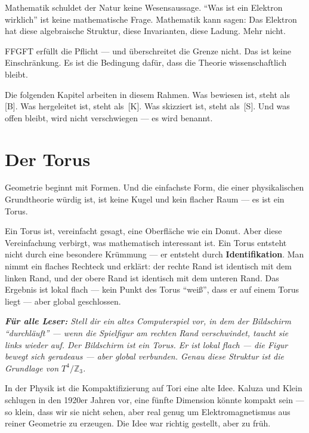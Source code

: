 \documentclass[11pt,oneside]{book}
\newcommand{\status}[1]{\penalty10000\,{\scriptsize\textcolor{gray!60}{[#1]}}}
\newenvironment{laierspur}{%
  \par\vspace{4pt}%
  \noindent\small\itshape\color{blue!60!black}%
  \textbf{Für alle Leser:}\enspace\ignorespaces}{%
  \par\vspace{4pt}\normalsize\normalfont\normalcolor}
\begin{document}
Mathematik schuldet der Natur keine Wesensaussage. \enquote{Was ist ein Elektron
wirklich} ist keine mathematische Frage. Mathematik kann sagen: Das Elektron
hat diese algebraische Struktur, diese Invarianten, diese Ladung. Mehr nicht.


FFGFT erfüllt die Pflicht — und überschreitet die Grenze nicht. Das ist
keine Einschränkung. Es ist die Bedingung dafür, dass die Theorie
wissenschaftlich bleibt.


Die folgenden Kapitel arbeiten in diesem Rahmen. Was bewiesen ist, steht
als \status{B}. Was hergeleitet ist, steht als \status{K}. Was skizziert ist, steht
als \status{S}. Und was offen bleibt, wird nicht verschwiegen — es wird benannt.






\chapter{Der Torus}

Geometrie beginnt mit Formen. Und die einfachste Form, die einer physikalischen
Grundtheorie würdig ist, ist keine Kugel und kein flacher Raum — es ist
ein Torus.


Ein Torus ist, vereinfacht gesagt, eine Oberfläche wie ein Donut. Aber diese
Vereinfachung verbirgt, was mathematisch interessant ist. Ein Torus entsteht
nicht durch eine besondere Krümmung — er entsteht durch \textbf{Identifikation}.
Man nimmt ein flaches Rechteck und erklärt: der rechte Rand ist identisch
mit dem linken Rand, und der obere Rand ist identisch mit dem unteren Rand.
Das Ergebnis ist lokal flach — kein Punkt des Torus \enquote{weiß}, dass er auf
einem Torus liegt — aber global geschlossen.


\begin{laierspur}
Stell dir ein altes Computerspiel vor, in dem der Bildschirm
\enquote{durchläuft} — wenn die Spielfigur am rechten Rand verschwindet, taucht
sie links wieder auf. Der Bildschirm ist ein Torus. Er ist lokal flach —
die Figur bewegt sich geradeaus — aber global verbunden. Genau diese
Struktur ist die Grundlage von $T^4/\mathbb{Z}_3$.
\end{laierspur}

In der Physik ist die Kompaktifizierung auf Tori eine alte Idee. Kaluza und
Klein schlugen in den 1920er Jahren vor, eine fünfte Dimension könnte
kompakt sein — so klein, dass wir sie nicht sehen, aber real genug um
Elektromagnetismus aus reiner Geometrie zu erzeugen. Die Idee war richtig
gestellt, aber zu früh.
\end{document}
